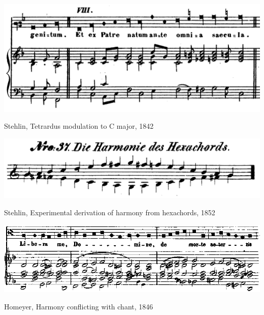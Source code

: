 \vspace*{\fill}

\newpage

\vspace*{\fill}

\begin{example}
  \centering
  \includegraphics[width=.8\linewidth]{c/1/ex/stehlin_etexpatre_31.png}
  \caption{Stehlin, Tetrardus modulation to C major, 1842}
  \label{mus:stehlin_etexpatre_31}
\end{example}

\vspace*{\fill}

\begin{example}
  \centering
  \includegraphics[width=.8\linewidth]{c/1/ex/stehlin_hexachords_54natur.png}
  \caption{Stehlin, Experimental derivation of harmony from hexachords, 1852}
  \label{mus:stehlin_hexachords_54}
\end{example}

\vspace*{\fill}

\newpage

\vspace*{\fill}

\begin{example}
  \centering
  \includegraphics[width=\linewidth]{c/1/ex/homeyer_libera_113.jpg}
  \caption{Homeyer, Harmony conflicting with chant, 1846}
  \label{mus:homeyer_libera_113}
\end{example}

